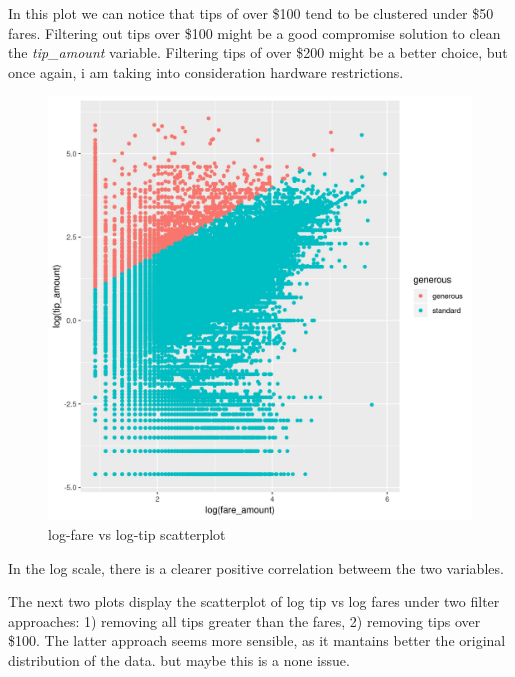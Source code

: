 \documentclass[11pt]{article}
\begin{document}
In this plot we can notice that tips of over \$100 tend to be clustered
under \$50 fares. Filtering out tips over \$100 might be a good compromise
solution to clean the \emph{tip\_amount} variable. Filtering tips of over \$200
might be a better choice, but once again, i am taking into consideration
hardware restrictions.

\begin{figure}[htbp]
\centering
\includegraphics[width=.9\linewidth]{./plots/logFareTipPlot.jpg}
\caption{\label{fig:orgd288986}
log-fare vs log-tip scatterplot}
\end{figure}

In the log scale, there is a clearer positive correlation betweem the two
variables.

The next two plots display the scatterplot of log tip vs log fares under two
filter approaches: 1) removing all tips greater than the fares, 2) removing
tips over \$100. The latter approach seems more sensible, as it mantains better
the original distribution of the data. but maybe this is a none issue. 
\end{document}
